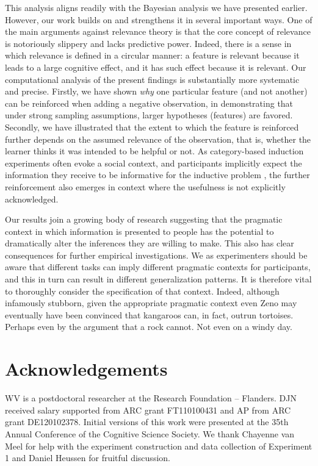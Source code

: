 \documentclass[authoryear,11pt]{elsarticle}
\begin{document}
This analysis aligns readily with the Bayesian analysis we have presented earlier. However, our work builds on and strengthens it in several important ways. One of the main arguments against relevance theory is that the core concept of relevance is notoriously slippery and lacks predictive power. Indeed, there is a sense in which relevance is defined in a circular manner: a feature is relevant because it leads to a large cognitive effect, and it has such effect because it is relevant. Our computational analysis of the present findings is substantially more systematic and precise. Firstly, we have shown {\it why} one particular feature (and not another) can be reinforced when adding a negative observation, in demonstrating that under strong sampling assumptions, larger hypotheses (features) are favored. Secondly, we have illustrated that the extent to which the feature is reinforced further depends on the assumed relevance of the observation, that is, whether the learner thinks it was intended to be helpful or not. As category-based induction experiments often evoke a social context, and participants implicitly expect the information they receive to be informative for the inductive problem \citep[e.g.][]{Medinetal2003}, the further reinforcement also emerges in context where the usefulness is not explicitly acknowledged.

Our results join a growing body of research suggesting that the pragmatic context in which information is presented to people has the potential to dramatically alter the inferences they are willing to make. This also has clear consequences for further empirical investigations. We as experimenters should be aware that different tasks can imply different pragmatic contexts for participants, and this in turn can result in different generalization patterns. It is therefore vital to thoroughly consider the specification of that context. Indeed, although infamously stubborn, given the appropriate pragmatic context even Zeno may eventually have been convinced that kangaroos can, in fact, outrun tortoises. Perhaps even by the argument that a rock cannot. Not even on a windy day.

\section{Acknowledgements}

WV is a postdoctoral researcher at the Research Foundation -- Flanders. DJN received salary supported from ARC grant FT110100431 and AP from ARC grant DE120102378. Initial versions of this work were presented at the 35th Annual Conference of the Cognitive Science Society. We thank Chayenne van Meel for help with the experiment construction and data collection of Experiment 1 and Daniel Heussen for fruitful discussion.
\end{document}
